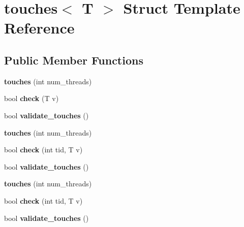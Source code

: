 \hypertarget{structtouches}{}\section{touches$<$ T $>$ Struct Template Reference}
\label{structtouches}
\subsection*{Public Member Functions}
\begin{DoxyCompactItemize}
\item 
\hypertarget{structtouches_a1312abcb3986c0a2188fd4b4432b4b40}{}{\bfseries touches} (int num\+\_\+threads)\label{structtouches_a1312abcb3986c0a2188fd4b4432b4b40}

\item 
\hypertarget{structtouches_a477f59c6147b37b0a00d174f7ec5c387}{}bool {\bfseries check} (T v)\label{structtouches_a477f59c6147b37b0a00d174f7ec5c387}

\item 
\hypertarget{structtouches_ae23f9f576f634980b837c56ed60e3e81}{}bool {\bfseries validate\+\_\+touches} ()\label{structtouches_ae23f9f576f634980b837c56ed60e3e81}

\item 
\hypertarget{structtouches_a1312abcb3986c0a2188fd4b4432b4b40}{}{\bfseries touches} (int num\+\_\+threads)\label{structtouches_a1312abcb3986c0a2188fd4b4432b4b40}

\item 
\hypertarget{structtouches_a4842a71fd3c5c716572c1c68a2a9ba3a}{}bool {\bfseries check} (int tid, T v)\label{structtouches_a4842a71fd3c5c716572c1c68a2a9ba3a}

\item 
\hypertarget{structtouches_ae23f9f576f634980b837c56ed60e3e81}{}bool {\bfseries validate\+\_\+touches} ()\label{structtouches_ae23f9f576f634980b837c56ed60e3e81}

\item 
\hypertarget{structtouches_a1312abcb3986c0a2188fd4b4432b4b40}{}{\bfseries touches} (int num\+\_\+threads)\label{structtouches_a1312abcb3986c0a2188fd4b4432b4b40}

\item 
\hypertarget{structtouches_a4842a71fd3c5c716572c1c68a2a9ba3a}{}bool {\bfseries check} (int tid, T v)\label{structtouches_a4842a71fd3c5c716572c1c68a2a9ba3a}

\item 
\hypertarget{structtouches_ae23f9f576f634980b837c56ed60e3e81}{}bool {\bfseries validate\+\_\+touches} ()\label{structtouches_ae23f9f576f634980b837c56ed60e3e81}

\end{DoxyCompactItemize}
